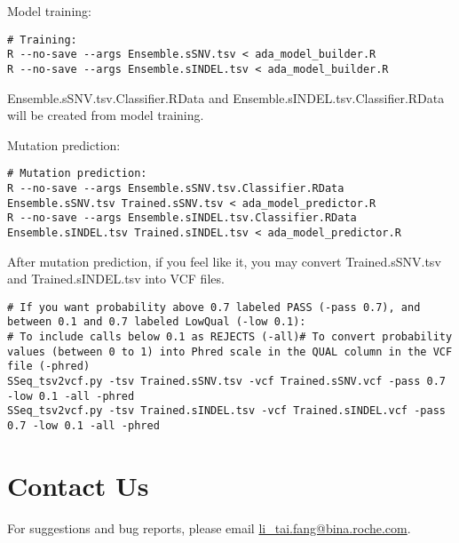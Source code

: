 \documentclass[10pt,letterpaper]{article}
\begin{document}
\begin{sloppypar}
Model training:
\begin{lstlisting}
# Training:
R --no-save --args Ensemble.sSNV.tsv < ada_model_builder.R
R --no-save --args Ensemble.sINDEL.tsv < ada_model_builder.R
\end{lstlisting}
	
Ensemble.sSNV.tsv.Classifier.RData and Ensemble.sINDEL.tsv.Classifier.RData will be created from model training.
	

Mutation prediction:
	
\begin{lstlisting}
# Mutation prediction:
R --no-save --args Ensemble.sSNV.tsv.Classifier.RData Ensemble.sSNV.tsv Trained.sSNV.tsv < ada_model_predictor.R
R --no-save --args Ensemble.sINDEL.tsv.Classifier.RData Ensemble.sINDEL.tsv Trained.sINDEL.tsv < ada_model_predictor.R
\end{lstlisting}

	
After mutation prediction, if you feel like it, you may convert Trained.sSNV.tsv and Trained.sINDEL.tsv into VCF files. 

\begin{lstlisting}
# If you want probability above 0.7 labeled PASS (-pass 0.7), and between 0.1 and 0.7 labeled LowQual (-low 0.1):
# To include calls below 0.1 as REJECTS (-all)# To convert probability values (between 0 to 1) into Phred scale in the QUAL column in the VCF file (-phred)
SSeq_tsv2vcf.py -tsv Trained.sSNV.tsv -vcf Trained.sSNV.vcf -pass 0.7 -low 0.1 -all -phred
SSeq_tsv2vcf.py -tsv Trained.sINDEL.tsv -vcf Trained.sINDEL.vcf -pass 0.7 -low 0.1 -all -phred
\end{lstlisting}




\section{Contact Us}
For suggestions and bug reports, please email \href{mailto:li_tai.fang@bina.roche.com}{li\_tai.fang@bina.roche.com}.


\end{sloppypar}
\end{document}

